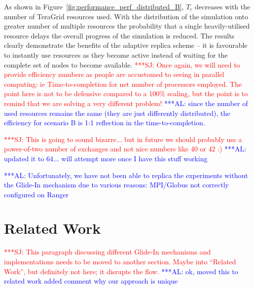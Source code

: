 \documentclass{rspublic}
\newcommand{\alnote}[1]{ {\textcolor{blue} { ***AL: #1 }}}
\newcommand{\jhanote}[1]{ {\textcolor{red} { ***SJ: #1 }}}
\newcommand{\alnote}[1]{}
\newcommand{\jhanote}[1]{}
\begin{document}
As shown in Figure~\ref{fig:performance_perf_distributed_B}, $T_{c}$
decreases with the number of TeraGrid resources used.  With the
distribution of the simulation onto greater number of multiple
resources the probability that a single heavily-utilised resource
delays the overall progress of the simulation is reduced.
The results clearly demonstrate the benefits of the adaptive replica
scheme -- it is favourable to instantly use resources as they become
active instead of waiting for the complete set of nodes to become
available.  \jhanote{Once again, we will need to provide efficiency
  numbers as people are accustomed to seeing in parallel computing: ie
  Time-to-completion for net number of processors employed.  The point
  here is not to be defensive compared to a 100\% scaling, but the
  point is to remind that we are solving a very different problem!}
\alnote{since the number of used resources remains the same (they are
  just differently distributed), the efficiency for scenario B is 1:1
  reflection in the time-to-completion.}

\jhanote{This is going to sound bizarre... but in future we should
  probably use a power-of-two number of exchanges and not nice numbers
  like 40 or 42 :)}           
\alnote{updated it to 64... will attempt more once I have this stuff working}

                                              
\alnote{Unfortunately, we have not been able to replica the
  experiments without the Glide-In mechanism due to various reasons:
  MPI/Globus not correctly configured on Ranger}


\section{Related Work}

\jhanote{This paragraph discussing different Glide-In mechanisms and
  implementations needs to be moved to another section. Maybe into
  ``Related Work'', but definitely not here; it disrupts the flow.}
\alnote{ok, moved this to related work added comment why our approach is unique}
\end{document}
